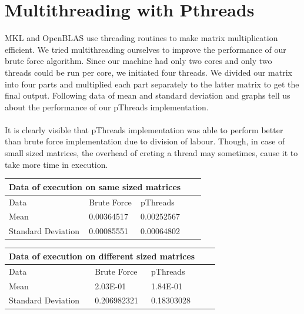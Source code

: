 \documentclass{article}
\begin{document}
\section*{Multithreading with Pthreads}
MKL and OpenBLAS use threading routines to make matrix multiplication efficient. We tried multithreading ourselves to improve the performance of our brute force algorithm. Since our machine had only two cores and only two threads could be run per core, we initiated four threads. We divided our matrix into four parts and multiplied each part separately to the latter matrix to get the final output. Following data of mean and standard deviation and graphs tell us about the performance of our pThreads implementation.\\
\\
It is clearly visible that pThreads implementation was able to perform better than brute force implementation due to division of labour. Though, in case of small sized matrices, the overhead of creting a thread may sometimes, cause it to take more time in execution.
\\
\begin{center}
\begin{tabular}[h!]{|l|l|l|l|l|}
\hline
\multicolumn{3}{|c|}{Data of execution on same sized matrices} \\
\hline
Data & Brute Force & pThreads\\
\hline
Mean & 0.00364517 & 0.00252567\\
\hline
Standard Deviation & 0.00085551 & 0.00064802\\
\hline
\end{tabular}
\end{center}
\begin{center}
\begin{tabular}[h]{|l|l|l|l|l|}
\hline
\multicolumn{3}{|c|}{Data of execution on different sized matrices} \\
\hline
Data & Brute Force & pThreads\\
\hline
Mean & 2.03E-01 & 1.84E-01\\
\hline
Standard Deviation & 0.206982321 & 0.18303028\\
\hline
\end{tabular}
\end{center}
\end{document}
